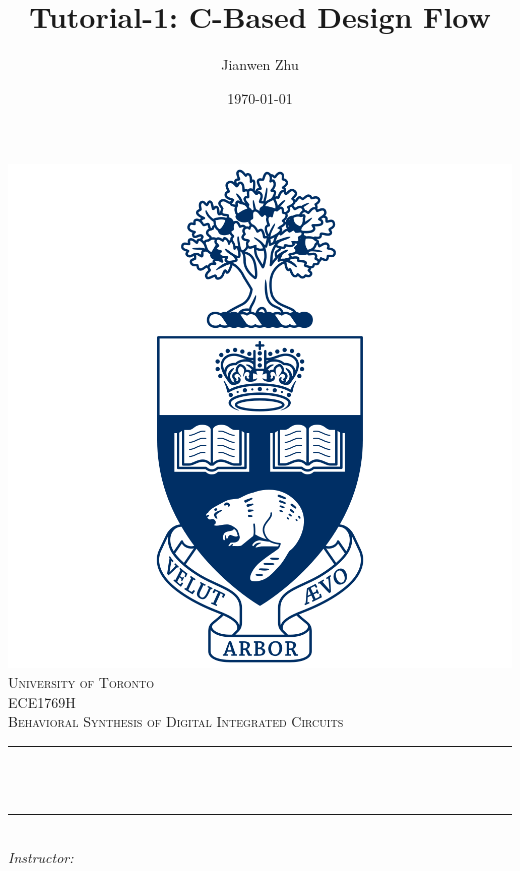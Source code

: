 \documentclass[12pt]{article}
\title{Tutorial-1: C-Based Design Flow}						%
\author{Jianwen Zhu}								%
\date{\today}									%
\makeatletter
\newcommand{\course} {ECE1769H}
\let\thetitle\@title
\let\theauthor\@author
\makeatother
\begin{document}

\begin{titlepage}
	\centering
    \vspace*{0.5 cm}
    \includegraphics[scale = 0.12]{UofT.png}\\[1.0 cm]	%
    \textsc{\LARGE University of Toronto}\\[2.0 cm]	%
	\textsc{\Large \course}\\[0.5 cm]				%
	\textsc{\large Behavioral Synthesis of Digital Integrated Circuits}\\[0.5 cm]				%
	\rule{\linewidth}{0.2 mm} \\[0.4 cm]
	{ \huge \bfseries \thetitle}\\
	\rule{\linewidth}{0.2 mm} \\[1.5 cm]
	
		\large
			\emph{Instructor:}\\
			\theauthor 
			
 
	\vfill
	
\end{titlepage}
\end{document}
